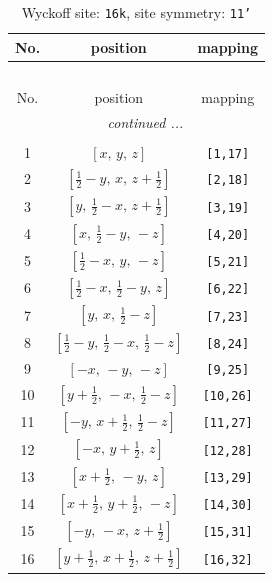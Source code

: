 \documentclass[fleqn,8pt]{jsarticle}
\begin{document}
\begin{longtable}{ccc}
\caption{Wyckoff site: {\tt 16k}, site symmetry: {\tt 11'}}
 \\
 \hline \hline
No. & position & mapping \\ \hline \endfirsthead

\multicolumn{2}{l}{\tablename\ \thetable{}} \\
 \hline \hline
No. & position & mapping \\ \hline \endhead

 \hline \hline
\multicolumn{2}{r}{\footnotesize\it continued ...} \\ \endfoot

 \hline \hline
\multicolumn{2}{r}{} \\ \endlastfoot

1 & $\left[ x,\, y,\, z \right]$ & {\tt [1,17]} \\ \hline
2 & $\left[ \frac{1}{2} - y,\, x,\, z + \frac{1}{2} \right]$ & {\tt [2,18]} \\ \hline
3 & $\left[ y,\, \frac{1}{2} - x,\, z + \frac{1}{2} \right]$ & {\tt [3,19]} \\ \hline
4 & $\left[ x,\, \frac{1}{2} - y,\, - z \right]$ & {\tt [4,20]} \\ \hline
5 & $\left[ \frac{1}{2} - x,\, y,\, - z \right]$ & {\tt [5,21]} \\ \hline
6 & $\left[ \frac{1}{2} - x,\, \frac{1}{2} - y,\, z \right]$ & {\tt [6,22]} \\ \hline
7 & $\left[ y,\, x,\, \frac{1}{2} - z \right]$ & {\tt [7,23]} \\ \hline
8 & $\left[ \frac{1}{2} - y,\, \frac{1}{2} - x,\, \frac{1}{2} - z \right]$ & {\tt [8,24]} \\ \hline
9 & $\left[ - x,\, - y,\, - z \right]$ & {\tt [9,25]} \\ \hline
10 & $\left[ y + \frac{1}{2},\, - x,\, \frac{1}{2} - z \right]$ & {\tt [10,26]} \\ \hline
11 & $\left[ - y,\, x + \frac{1}{2},\, \frac{1}{2} - z \right]$ & {\tt [11,27]} \\ \hline
12 & $\left[ - x,\, y + \frac{1}{2},\, z \right]$ & {\tt [12,28]} \\ \hline
13 & $\left[ x + \frac{1}{2},\, - y,\, z \right]$ & {\tt [13,29]} \\ \hline
14 & $\left[ x + \frac{1}{2},\, y + \frac{1}{2},\, - z \right]$ & {\tt [14,30]} \\ \hline
15 & $\left[ - y,\, - x,\, z + \frac{1}{2} \right]$ & {\tt [15,31]} \\ \hline
16 & $\left[ y + \frac{1}{2},\, x + \frac{1}{2},\, z + \frac{1}{2} \right]$ & {\tt [16,32]} \\
\end{longtable}
\end{document}
